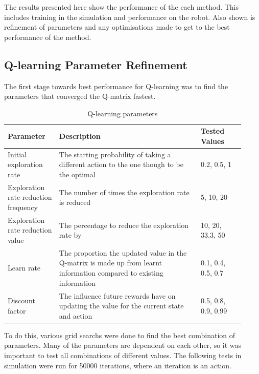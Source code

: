 \documentclass[12pt,a4paper]{article}
\begin{document}
The results presented here show the performance of the each method. This includes training in the simulation and performance on the robot. Also shown is refinement of parameters and any optimisations made to get to the best performance of the method. 

\subsection{Q-learning Parameter Refinement}
The first stage towards best performance for Q-learning was to find the parameters that converged the Q-matrix fastest.
\begin{table}[htb]
\centering
\caption{Q-learning parameters}
\vspace*{6pt}
\label{q_params}
\begin{tabular}{>{\raggedright}p{0.2\linewidth}p{0.55\linewidth}p{0.17\linewidth}}\hline
Parameter & Description& Tested Values\\ \hline\hline
Initial exploration rate & The starting probability of taking a different action to the one though to be the optimal & 0.2, 0.5, 1\\ \hline
Exploration rate reduction frequency & The number of times the exploration rate is reduced & 5, 10, 20\\ \hline
Exploration rate reduction value & The percentage to reduce the exploration rate by & 10, 20, 33.3, 50 \\\hline
Learn rate & The proportion the updated value in the Q-matrix is made up from learnt information compared to existing information & 0.1, 0.4, 0.5,  0.7 \\\hline
Discount factor & The influence future rewards have on updating the value for the current state and action & 0.5, 0.8, 0.9, 0.99 \\\hline
\end{tabular}
\end{table}
To do this, various grid searchs were done to find the best combination of parameters. Many of the parameters are dependent on each other, so it was important to test all combinations of different values. The following tests in simulation were run for 50000 iterations, where an iteration is an action.
\end{document}

